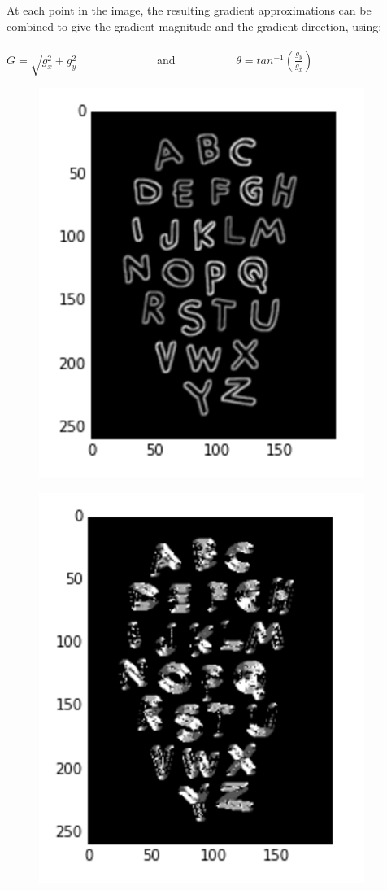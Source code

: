 \documentclass{article}
\begin{document}
		At each point in the image, the resulting gradient approximations can be combined to give the gradient magnitude and the gradient direction, using:\\ \\
		$G = \sqrt{g_{x}^{2} + g_{y}^{2}}$\ \ \ \ \ \ \ \ \ \ \ \ \ \  and \ \ \ \ \ \ \ \ \ \
		$\theta = tan^{-1}(\frac{g_{y}}{g_{x}})$

		\begin{figure}[H]
			\begin{minipage}{.5\textwidth}
				\centering
				\includegraphics[width=0.6\linewidth]{images/magnitude.png}
				\label{fig:test8}
			\end{minipage}
			\begin{minipage}{.5\textwidth}
				\centering
				\includegraphics[width=0.6\linewidth]{images/angle.png}
				\label{fig:test9}
			\end{minipage}
		\end{figure}
\end{document}
